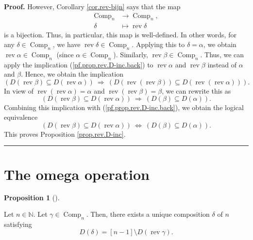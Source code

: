 \documentclass[numbers=enddot,12pt,final,onecolumn,notitlepage]{scrartcl}%
\theoremstyle{definition}
\newtheorem{prop}[theo]{Proposition}
\newenvironment{proposition}[1][]
{\begin{prop}[#1]\begin{leftbar}}
{\end{leftbar}\end{prop}}
\newenvironment{proof}[1][Proof]{\noindent\textbf{#1.} }{\ \rule{0.5em}{0.5em}}
\begin{document}
\begin{proof}
However, Corollary \ref{cor.rev-bijn} says that the map%
\begin{align*}
\operatorname*{Comp}\nolimits_{n} &  \rightarrow\operatorname*{Comp}%
\nolimits_{n},\\
\delta &  \mapsto\operatorname*{rev}\delta
\end{align*}
is a bijection. Thus, in particular, this map is well-defined. In other words,
for any $\delta\in\operatorname*{Comp}\nolimits_{n}$, we have
$\operatorname*{rev}\delta\in\operatorname*{Comp}\nolimits_{n}$. Applying this
to $\delta=\alpha$, we obtain $\operatorname*{rev}\alpha\in
\operatorname*{Comp}\nolimits_{n}$ (since $\alpha\in\operatorname*{Comp}%
\nolimits_{n}$). Similarly, $\operatorname*{rev}\beta\in\operatorname*{Comp}%
\nolimits_{n}$. Thus, we can apply the implication
(\ref{pf.prop.rev.D-inc.back}) to $\operatorname*{rev}\alpha$ and
$\operatorname*{rev}\beta$ instead of $\alpha$ and $\beta$. Hence, we obtain
the implication%
\[
\left(  D\left(  \operatorname*{rev}\beta\right)  \subseteq D\left(
\operatorname*{rev}\alpha\right)  \right)  \ \Longrightarrow\ \left(  D\left(
\operatorname*{rev}\left(  \operatorname*{rev}\beta\right)  \right)  \subseteq
D\left(  \operatorname*{rev}\left(  \operatorname*{rev}\alpha\right)  \right)
\right)  .
\]
In view of $\operatorname*{rev}\left(  \operatorname*{rev}\alpha\right)
=\alpha$ and $\operatorname*{rev}\left(  \operatorname*{rev}\beta\right)
=\beta$, we can rewrite this as
\[
\left(  D\left(  \operatorname*{rev}\beta\right)  \subseteq D\left(
\operatorname*{rev}\alpha\right)  \right)  \ \Longrightarrow\ \left(  D\left(
\beta\right)  \subseteq D\left(  \alpha\right)  \right)  .
\]
Combining this implication with (\ref{pf.prop.rev.D-inc.back}), we obtain the
logical equivalence%
\[
\left(  D\left(  \operatorname*{rev}\beta\right)  \subseteq D\left(
\operatorname*{rev}\alpha\right)  \right)  \ \Longleftrightarrow\ \left(
D\left(  \beta\right)  \subseteq D\left(  \alpha\right)  \right)  .
\]
This proves Proposition \ref{prop.rev.D-inc}.
\end{proof}

\section{The omega operation}

\begin{proposition}
\label{prop.omega-wd}Let $n\in\mathbb{N}$. Let $\gamma\in\operatorname*{Comp}%
\nolimits_{n}$. Then, there exists a unique composition $\delta$ of $n$
satisfying
\[
D\left(  \delta\right)  =\left[  n-1\right]  \setminus D\left(
\operatorname*{rev}\gamma\right)  .
\]

\end{proposition}
\end{document}
